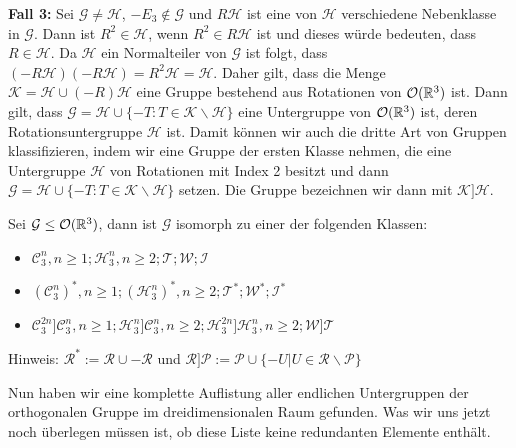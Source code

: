  \textbf{Fall 3:} Sei $\mathcal{G}\neq \mathcal{H}$, $-E_3 \notin \mathcal{G}$ und $R\mathcal{H}$ ist eine von $\mathcal{H}$ verschiedene Nebenklasse in $\mathcal{G}$. Dann ist $R^2\in\mathcal{H}$, wenn $R^2 \in R \mathcal{H}$ ist und dieses würde bedeuten, dass $R \in \mathcal{H}$. Da $\mathcal{H}$ ein Normalteiler von $\mathcal{G}$ ist folgt, dass $(-R\mathcal{H})(-R\mathcal{H})=R^2\mathcal{H}=\mathcal{H}$. Daher gilt, dass die Menge $\mathcal{K} = \mathcal{H} \cup (-R)\mathcal{H}$ eine Gruppe bestehend aus Rotationen von ${\mathcal{O}(\mathbb{R}^3)}$ ist. Dann gilt, dass $\mathcal{G} = \mathcal{H} \cup \{-T:T\in\mathcal{K}\backslash\mathcal{H}\}$ eine Untergruppe von ${\mathcal{O}(\mathbb{R}^3)}$ ist, deren Rotationsuntergruppe $\mathcal{H}$ ist. Damit können wir auch die dritte Art von Gruppen klassifizieren, indem wir eine Gruppe der ersten Klasse nehmen, die eine Untergruppe $\mathcal{H}$ von Rotationen mit Index 2 besitzt und dann $\mathcal{G}=\mathcal{H}\cup\{-T:T\in\mathcal{K}\backslash\mathcal{H}\}$ setzen. Die Gruppe bezeichnen wir dann mit $\mathcal{K}]\mathcal{H}$.


\begin{theorem}
 Sei $\mathcal{G}\leq{\mathcal{O}(\mathbb{R}^3)}$, dann ist $\mathcal{G}$ isomorph zu einer der folgenden Klassen:
 \begin{itemize}
  \item $\mathcal{C}^n_3,n\geq1;\mathcal{H}^n_3,n\geq2;\mathcal{T};\mathcal{W};\mathcal{I}$
  \item $(\mathcal{C}^n_3)^*,n\geq1;(\mathcal{H}^n_3)^*,n\geq 2;\mathcal{T}^*;\mathcal{W}^*;\mathcal{I}^*$
  \item $\mathcal{C}^{2n}_3]\mathcal{C}^n_3,n\geq1;\mathcal{H}^n_3]\mathcal{C}^n_3,n\geq 2;\mathcal{H}^{2n}_3]\mathcal{H}^n_3,n\geq2;\mathcal{W}]\mathcal{T}$
\end{itemize}
Hinweis: $\mathcal{R}^*:=\mathcal{R}\cup -\mathcal{R}$ und $\mathcal{R}]\mathcal{P}:=\mathcal{P}\cup \{-U|U\in \mathcal{R} \backslash \mathcal{P} \}$
\end{theorem}
Nun haben wir eine komplette Auflistung aller endlichen Untergruppen der orthogonalen Gruppe im dreidimensionalen Raum gefunden. Was wir uns jetzt noch überlegen müssen ist, ob diese Liste keine redundanten Elemente enthält.


